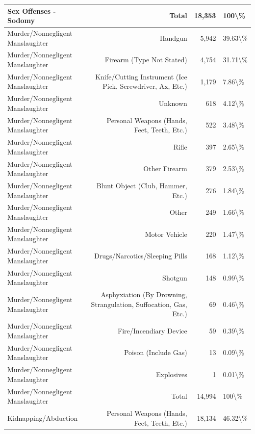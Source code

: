 \documentclass[
]{krantz}
\begin{document}
\begin{longtable}[t]{l|r|r|l}
\hline
Sex Offenses - Sodomy & Total & 18,353 & 100\textbackslash{}\%\\
\hline
Murder/Nonnegligent Manslaughter & Handgun & 5,942 & 39.63\textbackslash{}\%\\
\hline
Murder/Nonnegligent Manslaughter & Firearm (Type Not Stated) & 4,754 & 31.71\textbackslash{}\%\\
\hline
Murder/Nonnegligent Manslaughter & Knife/Cutting Instrument (Ice Pick, Screwdriver, Ax, Etc.) & 1,179 & 7.86\textbackslash{}\%\\
\hline
Murder/Nonnegligent Manslaughter & Unknown & 618 & 4.12\textbackslash{}\%\\
\hline
Murder/Nonnegligent Manslaughter & Personal Weapons (Hands, Feet, Teeth, Etc.) & 522 & 3.48\textbackslash{}\%\\
\hline
Murder/Nonnegligent Manslaughter & Rifle & 397 & 2.65\textbackslash{}\%\\
\hline
Murder/Nonnegligent Manslaughter & Other Firearm & 379 & 2.53\textbackslash{}\%\\
\hline
Murder/Nonnegligent Manslaughter & Blunt Object (Club, Hammer, Etc.) & 276 & 1.84\textbackslash{}\%\\
\hline
Murder/Nonnegligent Manslaughter & Other & 249 & 1.66\textbackslash{}\%\\
\hline
Murder/Nonnegligent Manslaughter & Motor Vehicle & 220 & 1.47\textbackslash{}\%\\
\hline
Murder/Nonnegligent Manslaughter & Drugs/Narcotics/Sleeping Pills & 168 & 1.12\textbackslash{}\%\\
\hline
Murder/Nonnegligent Manslaughter & Shotgun & 148 & 0.99\textbackslash{}\%\\
\hline
Murder/Nonnegligent Manslaughter & Asphyxiation (By Drowning, Strangulation, Suffocation, Gas, Etc.) & 69 & 0.46\textbackslash{}\%\\
\hline
Murder/Nonnegligent Manslaughter & Fire/Incendiary Device & 59 & 0.39\textbackslash{}\%\\
\hline
Murder/Nonnegligent Manslaughter & Poison (Include Gas) & 13 & 0.09\textbackslash{}\%\\
\hline
Murder/Nonnegligent Manslaughter & Explosives & 1 & 0.01\textbackslash{}\%\\
\hline
Murder/Nonnegligent Manslaughter & Total & 14,994 & 100\textbackslash{}\%\\
\hline
Kidnapping/Abduction & Personal Weapons (Hands, Feet, Teeth, Etc.) & 18,134 & 46.32\textbackslash{}\%\\

\end{longtable}
\end{document}
